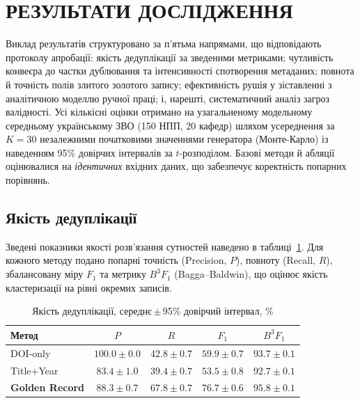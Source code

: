 \section*{РЕЗУЛЬТАТИ ДОСЛІДЖЕННЯ}

Виклад результатів структуровано за п'ятьма напрямами, що відповідають протоколу апробації: якість дедуплікації за зведеними метриками; чутливість конвеєра до частки дублювання та інтенсивності спотворення метаданих; повнота й точність полів злитого золотого запису; ефективність рушія у зіставленні з аналітичною моделлю ручної праці; і, нарешті, систематичний аналіз загроз валідності. Усі кількісні оцінки отримано на узагальненому модельному середньому українському ЗВО (150 НПП, 20 кафедр) шляхом усереднення за $K=30$ незалежними початковими значеннями генератора (Монте-Карло) із наведенням 95\% довірчих інтервалів за $t$-розподілом. Базові методи й абляції оцінювалися на \textit{ідентичних} вхідних даних, що забезпечує коректність попарних порівнянь.

\subsection*{Якість дедуплікації}

Зведені показники якості розв'язання сутностей наведено в таблиці~\ref{tab:res-dedup}. Для кожного методу подано попарні точність (Precision, $P$), повноту (Recall, $R$), збалансовану міру $F_1$ та метрику $B^3 F_1$ (Bagga--Baldwin), що оцінює якість кластеризації на рівні окремих записів.

\begin{table}[ht]
\centering
\caption{Якість дедуплікації, середнє\,$\pm$\,95\% довірчий інтервал, \%}
\label{tab:res-dedup}
\begin{tabular}{lcccc}
\toprule
Метод & $P$ & $R$ & $F_1$ & $B^3 F_1$ \\
\midrule
DOI-only        & $100.0 \pm 0.0$ & $42.8 \pm 0.7$ & $59.9 \pm 0.7$ & $93.7 \pm 0.1$ \\
Title+Year      & $83.4 \pm 1.0$  & $39.4 \pm 0.7$ & $53.5 \pm 0.8$ & $92.7 \pm 0.1$ \\
\textbf{Golden Record} & $\mathbf{88.3 \pm 0.7}$ & $\mathbf{67.8 \pm 0.7}$ & $\mathbf{76.7 \pm 0.6}$ & $\mathbf{95.8 \pm 0.1}$ \\
\bottomrule
\end{tabular}
\end{table}

